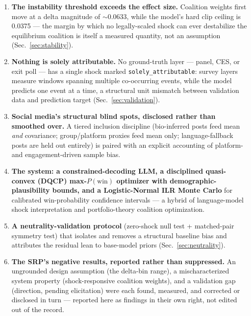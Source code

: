 \documentclass[11pt]{article}
\begin{document}
\begin{enumerate}
  \item \textbf{The instability threshold exceeds the effect size.}
        Coalition weights first move at a delta magnitude of $\sim$0.0633,
        while the model's hard clip ceiling is 0.0375 --- the margin by which
        no legally-scaled shock can ever destabilize the equilibrium
        coalition is itself a measured quantity, not an assumption
        (Sec.~\ref{sec:stability}).
  \item \textbf{Nothing is solely attributable.} No ground-truth layer ---
        panel, CES, or exit poll --- has a single shock marked
        \texttt{solely\_attributable}: survey layers measure windows spanning
        multiple co-occurring events, while the model predicts one event at a
        time, a structural unit mismatch between validation data and
        prediction target (Sec.~\ref{sec:validation}).
  \item \textbf{Social media's structural blind spots, disclosed rather than
        smoothed over.} A tiered inclusion discipline (bio-inferred posts feed
        mean \emph{and} covariance; group/platform proxies feed mean only;
        language-fallback posts are held out entirely) is paired with an
        explicit accounting of platform- and engagement-driven sample bias.
  \item \textbf{The system: a constrained-decoding LLM, a disciplined
        quasi-convex (DQCP) max-$P(\text{win})$ optimizer with
        demographic-plausibility bounds, and a Logistic-Normal ILR Monte
        Carlo} for calibrated win-probability confidence intervals ---
        a hybrid of language-model shock interpretation and portfolio-theory
        coalition optimization.
  \item \textbf{A neutrality-validation protocol} (zero-shock null test +
        matched-pair symmetry test) that isolates and removes a structural
        baseline bias and attributes the residual lean to base-model priors
        (Sec.~\ref{sec:neutrality}).
  \item \textbf{The SRP's negative results, reported rather than
        suppressed.} An ungrounded design assumption (the delta-bin range),
        a mischaracterized system property (shock-responsive coalition
        weights), and a validation gap (direction, pending elicitation) were
        each found, measured, and corrected or disclosed in turn --- reported
        here as findings in their own right, not edited out of the record.
\end{enumerate}
\end{document}
